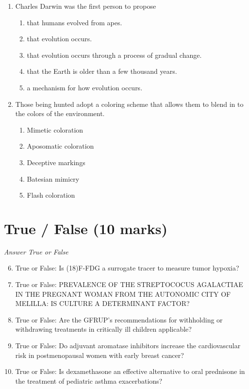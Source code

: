 \documentclass[12pt]{article}
\begin{document}
\begin{enumerate}[label=\arabic*.]
\begin{enumerate}[label=(\alph*)]
    \item Epilepsy is caused by an autosomal dominant trait.
    \item Epilepsy is due to an autosomal recessive trait.
\end{enumerate}
\item Charles Darwin was the first person to propose
\begin{enumerate}[label=(\alph*)]
    \item that humans evolved from apes.
    \item that evolution occurs.
    \item that evolution occurs through a process of gradual change.
    \item that the Earth is older than a few thousand years.
    \item a mechanism for how evolution occurs.
\end{enumerate}
\item Those being hunted adopt a coloring scheme that allows them to blend in to the colors of the environment.
\begin{enumerate}[label=(\alph*)]
    \item Mimetic coloration
    \item Aposomatic coloration
    \item Deceptive markings
    \item Batesian mimicry
    \item Flash coloration
\end{enumerate}
\end{enumerate}

\section*{True / False (10 marks)}
\textit{Answer True or False}
\begin{enumerate}[label=\arabic*.]
\setcounter{enumi}{5}
\item True or False: Is (18)F-FDG a surrogate tracer to measure tumor hypoxia?
\item True or False: PREVALENCE OF THE STREPTOCOCUS AGALACTIAE IN THE PREGNANT WOMAN FROM THE AUTONOMIC CITY OF MELILLA: IS CULTURE A DETERMINANT FACTOR?
\item True or False: Are the GFRUP's recommendations for withholding or withdrawing treatments in critically ill children applicable?
\item True or False: Do adjuvant aromatase inhibitors increase the cardiovascular risk in postmenopausal women with early breast cancer?
\item True or False: Is dexamethasone an effective alternative to oral prednisone in the treatment of pediatric asthma exacerbations?
\end{enumerate}
\end{document}
